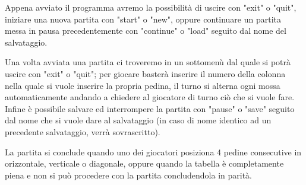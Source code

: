 \documentclass{article}
\begin{document}
Appena avviato il programma avremo la possibilità di uscire con "exit" o "quit", iniziare una nuova partita con "start" o "new", oppure continuare un partita messa in pausa precedentemente con "continue" o "load" seguito dal nome del salvataggio.

Una volta avviata una partita ci troveremo in un sottomenù dal quale si potrà uscire con "exit" o "quit"; per giocare basterà inserire il numero della colonna nella quale si vuole inserire la propria pedina, il turno si alterna ogni mossa automaticamente andando a chiedere al giocatore di turno ciò che si vuole fare.
Infine è possibile salvare ed interrompere la partita con "pause" o "save" seguito dal nome che si vuole dare al salvataggio (in caso di nome identico ad un precedente salvataggio, verrà sovrascritto).

La partita si conclude quando uno dei giocatori posiziona 4 pedine consecutive in orizzontale, verticale o diagonale, oppure quando la tabella è completamente piena e non si può procedere con la partita concludendola in parità.
\end{document}

